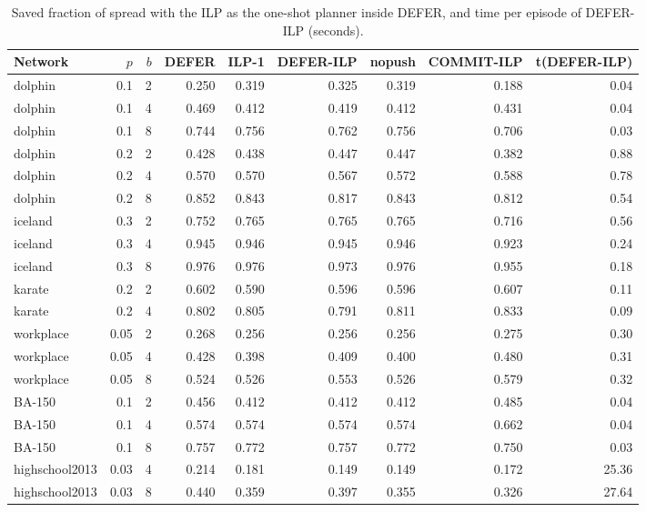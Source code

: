 \documentclass[preprint,11pt]{elsarticle}
\theoremstyle{definition}
\theoremstyle{remark}
\begin{document}
\begin{table}[h]
\centering
\caption{Saved fraction of spread with the ILP as the one-shot planner inside DEFER,
and time per episode of DEFER-ILP (seconds).\label{tab:defer-ilp}}
\footnotesize
\begin{tabular}{lrrrrrrrr}
\hline
Network & $p$ & $b$ & DEFER & ILP-1 & DEFER-ILP & nopush & COMMIT-ILP & t(DEFER-ILP)\\
\hline
dolphin & 0.1 & 2 & 0.250 & 0.319 & 0.325 & 0.319 & 0.188 & 0.04 \\
dolphin & 0.1 & 4 & 0.469 & 0.412 & 0.419 & 0.412 & 0.431 & 0.04 \\
dolphin & 0.1 & 8 & 0.744 & 0.756 & 0.762 & 0.756 & 0.706 & 0.03 \\
dolphin & 0.2 & 2 & 0.428 & 0.438 & 0.447 & 0.447 & 0.382 & 0.88 \\
dolphin & 0.2 & 4 & 0.570 & 0.570 & 0.567 & 0.572 & 0.588 & 0.78 \\
dolphin & 0.2 & 8 & 0.852 & 0.843 & 0.817 & 0.843 & 0.812 & 0.54 \\
iceland & 0.3 & 2 & 0.752 & 0.765 & 0.765 & 0.765 & 0.716 & 0.56 \\
iceland & 0.3 & 4 & 0.945 & 0.946 & 0.945 & 0.946 & 0.923 & 0.24 \\
iceland & 0.3 & 8 & 0.976 & 0.976 & 0.973 & 0.976 & 0.955 & 0.18 \\
karate & 0.2 & 2 & 0.602 & 0.590 & 0.596 & 0.596 & 0.607 & 0.11 \\
karate & 0.2 & 4 & 0.802 & 0.805 & 0.791 & 0.811 & 0.833 & 0.09 \\
workplace & 0.05 & 2 & 0.268 & 0.256 & 0.256 & 0.256 & 0.275 & 0.30 \\
workplace & 0.05 & 4 & 0.428 & 0.398 & 0.409 & 0.400 & 0.480 & 0.31 \\
workplace & 0.05 & 8 & 0.524 & 0.526 & 0.553 & 0.526 & 0.579 & 0.32 \\
BA-150 & 0.1 & 2 & 0.456 & 0.412 & 0.412 & 0.412 & 0.485 & 0.04 \\
BA-150 & 0.1 & 4 & 0.574 & 0.574 & 0.574 & 0.574 & 0.662 & 0.04 \\
BA-150 & 0.1 & 8 & 0.757 & 0.772 & 0.757 & 0.772 & 0.750 & 0.03 \\
highschool2013 & 0.03 & 4 & 0.214 & 0.181 & 0.149 & 0.149 & 0.172 & 25.36 \\
highschool2013 & 0.03 & 8 & 0.440 & 0.359 & 0.397 & 0.355 & 0.326 & 27.64 \\
\hline
\end{tabular}
\end{table}
\end{document}
